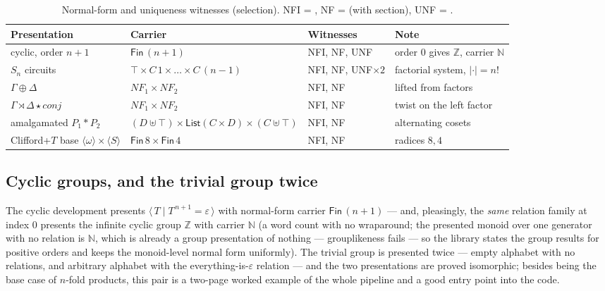 \begin{table}
\caption{Normal-form and uniqueness witnesses (selection).  NFI =
, NF =  (with section), UNF =
.}
\label{tab:nfs}
\centering
\small
\begin{tabular}{@{}llll@{}}
\toprule
Presentation & Carrier & Witnesses & Note \\
\midrule
cyclic, order $n{+}1$ & $\mathsf{Fin}\,(n{+}1)$ & NFI, NF, UNF & order $0$ gives $\mathbb{Z}$, carrier $\mathbb{N}$ \\
$S_n$ circuits & $\top \times C\,1 \times \dots \times C\,(n{-}1)$ & NFI, NF, UNF$\times 2$ & factorial system, $|{\cdot}| = n!$ \\
$\Gamma \oplus \Delta$ & $\mathit{NF}_1 \times \mathit{NF}_2$ & NFI, NF & lifted from factors \\
$\Gamma \rtimes \Delta \star \mathit{conj}$ & $\mathit{NF}_1 \times \mathit{NF}_2$ & NFI, NF & twist on the left factor \\
amalgamated $P_1 \ast P_2$ & $(D \uplus \top) \times \mathsf{List}(C {\times} D) \times (C \uplus \top)$ & NFI, NF & alternating cosets \\
Clifford+$T$ base $\langle \omega \rangle {\times} \langle S \rangle$ & $\mathsf{Fin}\,8 \times \mathsf{Fin}\,4$ & NFI, NF & radices $8, 4$ \\
\bottomrule
\end{tabular}
\end{table}

\subsection{Cyclic groups, and the trivial group twice}

The cyclic development presents $\langle\, T \mid T^{\,n+1} =
\varepsilon\,\rangle$ with normal-form carrier $\mathsf{Fin}\,(n{+}1)$ ---
and, pleasingly, the \emph{same} relation family at index $0$ presents the
infinite cyclic group $\mathbb{Z}$ with carrier $\mathbb{N}$ (a word count
with no wraparound; the presented monoid over one generator with no
relation is $\mathbb{N}$, which is already a group presentation of nothing
--- grouplikeness fails --- so the library states the group results for
positive orders and keeps the monoid-level normal form uniformly).  The
trivial group is presented twice --- empty alphabet with no relations, and
arbitrary alphabet with the everything-is-$\varepsilon$ relation --- and
the two presentations are proved isomorphic; besides being the base case
of $n$-fold products, this pair is a two-page worked example of the whole
pipeline and a good entry point into the code.

